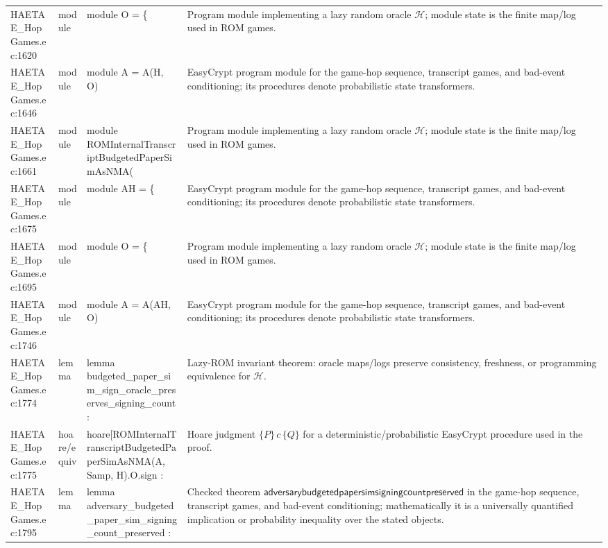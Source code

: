 \documentclass[10pt]{article}
\begin{document}
\begin{longtable}{L{0.11\textwidth}L{0.055\textwidth}L{0.385\textwidth}L{0.41\textwidth}}
HAETAE\_\allowbreak{}HopGames.\allowbreak{}ec:\allowbreak{}1620 & module & {\ttfamily\scriptsize module O = \{} & Program module implementing a lazy random oracle $\mathcal H$; module state is the finite map/log used in ROM games. \\
HAETAE\_\allowbreak{}HopGames.\allowbreak{}ec:\allowbreak{}1646 & module & {\ttfamily\scriptsize module A = A(H, O)} & EasyCrypt program module for the game-hop sequence, transcript games, and bad-event conditioning; its procedures denote probabilistic state transformers. \\
HAETAE\_\allowbreak{}HopGames.\allowbreak{}ec:\allowbreak{}1661 & module & {\ttfamily\scriptsize module ROMInternalTranscriptBudgetedPaperSimAsNMA(} & Program module implementing a lazy random oracle $\mathcal H$; module state is the finite map/log used in ROM games. \\
HAETAE\_\allowbreak{}HopGames.\allowbreak{}ec:\allowbreak{}1675 & module & {\ttfamily\scriptsize module AH = \{} & EasyCrypt program module for the game-hop sequence, transcript games, and bad-event conditioning; its procedures denote probabilistic state transformers. \\
HAETAE\_\allowbreak{}HopGames.\allowbreak{}ec:\allowbreak{}1695 & module & {\ttfamily\scriptsize module O = \{} & Program module implementing a lazy random oracle $\mathcal H$; module state is the finite map/log used in ROM games. \\
HAETAE\_\allowbreak{}HopGames.\allowbreak{}ec:\allowbreak{}1746 & module & {\ttfamily\scriptsize module A = A(AH, O)} & EasyCrypt program module for the game-hop sequence, transcript games, and bad-event conditioning; its procedures denote probabilistic state transformers. \\
HAETAE\_\allowbreak{}HopGames.\allowbreak{}ec:\allowbreak{}1774 & lemma & {\ttfamily\scriptsize lemma budgeted\_\allowbreak{}paper\_\allowbreak{}sim\_\allowbreak{}sign\_\allowbreak{}oracle\_\allowbreak{}preserves\_\allowbreak{}signing\_\allowbreak{}count :} & Lazy-ROM invariant theorem: oracle maps/logs preserve consistency, freshness, or programming equivalence for $\mathcal H$. \\
HAETAE\_\allowbreak{}HopGames.\allowbreak{}ec:\allowbreak{}1775 & hoare/equiv & {\ttfamily\scriptsize hoare[ROMInternalTranscriptBudgetedPaperSimAsNMA(A, Samp, H).O.sign :} & Hoare judgment $\{P\}\,c\,\{Q\}$ for a deterministic/probabilistic EasyCrypt procedure used in the proof. \\
HAETAE\_\allowbreak{}HopGames.\allowbreak{}ec:\allowbreak{}1795 & lemma & {\ttfamily\scriptsize lemma adversary\_\allowbreak{}budgeted\_\allowbreak{}paper\_\allowbreak{}sim\_\allowbreak{}signing\_\allowbreak{}count\_\allowbreak{}preserved :} & Checked theorem $\mathsf{adversarybudgetedpapersimsigningcountpreserved}$ in the game-hop sequence, transcript games, and bad-event conditioning; mathematically it is a universally quantified implication or probability inequality over the stated objects. \\

\end{longtable}
\end{document}
